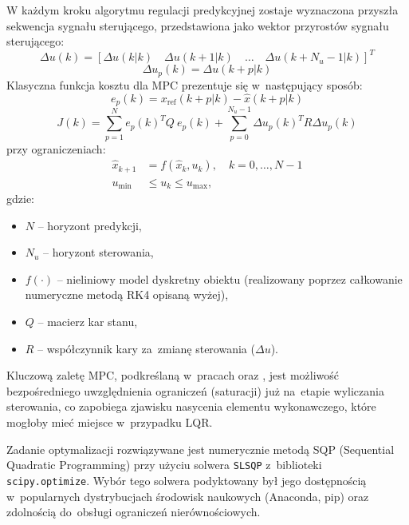 W każdym kroku algorytmu regulacji predykcyjnej zostaje wyznaczona przyszła sekwencja sygnału sterującego, przedstawiona jako wektor przyrostów sygnału sterującego:
\begin{equation}
\Delta u(k) = \left[ \Delta u(k|k) \quad \Delta u(k+1|k) \quad \dots \quad \Delta u(k+N_{u}-1|k) \right]^{T}
\end{equation}
\begin{equation} %
\Delta u_{p}(k)=\Delta u(k+p|k)
\end{equation}
Klasyczna funkcja kosztu dla MPC prezentuje się w~następujący sposób:
\begin{equation}
e_{p}(k)={x}_{\mathrm{ref}}(k+p|k) - \hat{x}(k+p|k)
\end{equation}
\begin{equation} 
J(k)=\sum_{p=1}^{N}e_{p}(k)^{T}Q~e_{p}(k)+\sum_{p=0}^{N_{u}-1}\Delta u_{p}(k)^{T}R\Delta u_{p}(k)
\end{equation}
przy ograniczeniach:
\begin{align}
    \hat{x}_{k+1} &= f(\hat{x}_k, u_k), \quad k=0,\dots,N-1 \\
    u_{\mathrm{min}} &\le u_k \le u_{\mathrm{max}},
\end{align}
gdzie:
\begin{itemize}
    \item $N $ -- horyzont predykcji,
    \item $N_u$ -- horyzont sterowania,
    \item $f(\cdot)$ -- nieliniowy model dyskretny obiektu (realizowany poprzez całkowanie numeryczne metodą RK4 opisaną wyżej),
    \item $Q $ -- macierz kar stanu,
    \item $R$ -- współczynnik kary za~zmianę sterowania ($\Delta u$).
\end{itemize}
Kluczową zaletę MPC, podkreślaną w~pracach \cite{Mills2009} oraz
\cite{Jezierski2017}, jest możliwość bezpośredniego uwzględnienia ograniczeń
(saturacji) już na~etapie wyliczania sterowania, co zapobiega zjawisku
nasycenia elementu wykonawczego, które mogłoby mieć miejsce w~przypadku LQR.

Zadanie optymalizacji rozwiązywane jest numerycznie metodą SQP (Sequential
Quadratic Programming) przy użyciu solwera \texttt{SLSQP} z~biblioteki 
\texttt{scipy.optimize}. Wybór tego solwera podyktowany był jego dostępnością 
w~popularnych dystrybucjach środowisk naukowych (Anaconda, pip) oraz zdolnością 
do~obsługi ograniczeń nierównościowych.


